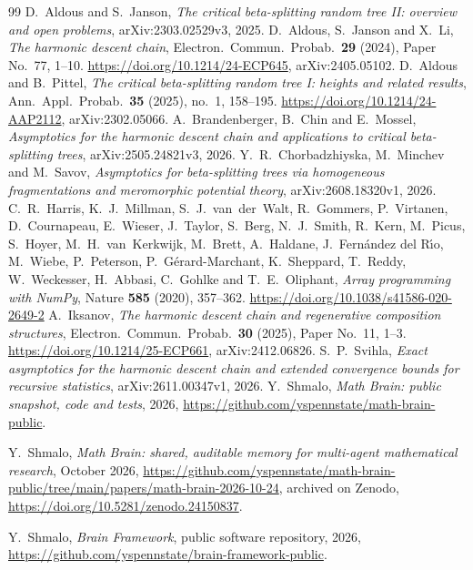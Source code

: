 \documentclass[11pt]{amsart}
\theoremstyle{remark}
\numberwithin{equation}{section}
\begin{document}
\begin{thebibliography}{99}
 D.~Aldous and S.~Janson, \emph{The critical beta-splitting random tree II: overview and open problems},
arXiv:2303.02529v3, 2025.
 D.~Aldous, S.~Janson and X.~Li, \emph{The harmonic descent chain}, Electron.\ Commun.\ Probab.\ \textbf{29} (2024), Paper No.~77, 1--10. \url{https://doi.org/10.1214/24-ECP645}, arXiv:2405.05102.
 D.~Aldous and B.~Pittel, \emph{The critical beta-splitting random tree I: heights and related results},
Ann.\ Appl.\ Probab.\ \textbf{35} (2025), no.~1, 158--195. \url{https://doi.org/10.1214/24-AAP2112}, arXiv:2302.05066.
 A.~Brandenberger, B.~Chin and E.~Mossel, \emph{Asymptotics for the harmonic descent chain and applications
to critical beta-splitting trees}, arXiv:2505.24821v3, 2026.
 Y.~R.~Chorbadzhiyska, M.~Minchev and M.~Savov, \emph{Asymptotics for beta-splitting trees via homogeneous fragmentations and meromorphic potential theory}, arXiv:2608.18320v1, 2026.
 C.~R.~Harris, K.~J.~Millman, S.~J.~van~der~Walt, R.~Gommers, P.~Virtanen, D.~Cournapeau, E.~Wieser, J.~Taylor, S.~Berg, N.~J.~Smith, R.~Kern, M.~Picus, S.~Hoyer, M.~H.~van~Kerkwijk, M.~Brett, A.~Haldane, J.~Fern\'andez del R\'{\i}o, M.~Wiebe, P.~Peterson, P.~G\'erard-Marchant, K.~Sheppard, T.~Reddy, W.~Weckesser, H.~Abbasi, C.~Gohlke and T.~E.~Oliphant, \emph{Array programming with NumPy}, Nature \textbf{585} (2020), 357--362. \url{https://doi.org/10.1038/s41586-020-2649-2}
 A.~Iksanov, \emph{The harmonic descent chain and regenerative composition structures}, Electron.\ Commun.\ Probab.\ \textbf{30} (2025), Paper No.~11, 1--3. \url{https://doi.org/10.1214/25-ECP661}, arXiv:2412.06826.
 S.~P.~Svihla, \emph{Exact asymptotics for the harmonic descent chain and extended convergence bounds for
recursive statistics}, arXiv:2611.00347v1, 2026.
 Y.~Shmalo, \emph{Math Brain: public snapshot, code and tests}, 2026, \url{https://github.com/yspennstate/math-brain-public}.

 Y.~Shmalo, \emph{Math Brain: shared, auditable memory for multi-agent mathematical research}, October 2026, \url{https://github.com/yspennstate/math-brain-public/tree/main/papers/math-brain-2026-10-24}, archived on Zenodo, \url{https://doi.org/10.5281/zenodo.24150837}.

 Y.~Shmalo, \emph{Brain Framework}, public software repository, 2026, \url{https://github.com/yspennstate/brain-framework-public}.

\end{thebibliography}
\end{document}
